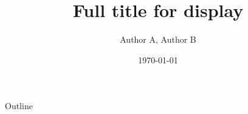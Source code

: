 \documentclass[final, 12pt]{beamer}
\title[Short title]{Full title for display}
\author[Author in foot]{Author A, Author B}
\institute[Short institute name]{Institute name}
\date{\today}
\begin{document}
\begin{lplainframe}
\titlepage
\end{lplainframe}
\begin{frame}{Outline}
\tableofcontents
\end{frame}

\end{document}
